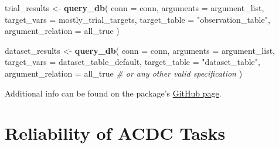 \documentclass[
  man,floatsintext]{apa6}
\newenvironment{Shaded}{\begin{snugshade}}{\end{snugshade}}
\newcommand{\AttributeTok}[1]{\textcolor[rgb]{0.13,0.29,0.53}{#1}}
\newcommand{\CommentTok}[1]{\textcolor[rgb]{0.56,0.35,0.01}{\textit{#1}}}
\newcommand{\FunctionTok}[1]{\textcolor[rgb]{0.13,0.29,0.53}{\textbf{#1}}}
\newcommand{\NormalTok}[1]{#1}
\newcommand{\OtherTok}[1]{\textcolor[rgb]{0.56,0.35,0.01}{#1}}
\newcommand{\StringTok}[1]{\textcolor[rgb]{0.31,0.60,0.02}{#1}}
\begin{document}
\begin{Shaded}
\begin{Highlighting}[]
\NormalTok{trial\_results }\OtherTok{\textless{}{-}} \FunctionTok{query\_db}\NormalTok{(}
  \AttributeTok{conn =}\NormalTok{ conn,}
  \AttributeTok{arguments =}\NormalTok{ argument\_list,}
  \AttributeTok{target\_vars =}\NormalTok{ mostly\_trial\_targets,}
  \AttributeTok{target\_table =} \StringTok{"observation\_table"}\NormalTok{,}
  \AttributeTok{argument\_relation =}\NormalTok{ all\_true}
\NormalTok{)}

\NormalTok{dataset\_results }\OtherTok{\textless{}{-}} \FunctionTok{query\_db}\NormalTok{(}
  \AttributeTok{conn =}\NormalTok{ conn,}
  \AttributeTok{arguments =}\NormalTok{ argument\_list,}
  \AttributeTok{target\_vars =}\NormalTok{ dataset\_table\_default, }
  \AttributeTok{target\_table =} \StringTok{"dataset\_table"}\NormalTok{,}
  \AttributeTok{argument\_relation =}\NormalTok{ all\_true }\CommentTok{\# or any other valid specification}
\NormalTok{)}
\end{Highlighting}
\end{Shaded}

Additional info can be found on the package's \href{https://github.com/SLesche/acdc-query}{GitHub page}.

\hypertarget{reliability-of-acdc-tasks}{%
\section{Reliability of ACDC Tasks}\label{reliability-of-acdc-tasks}}
\end{document}

